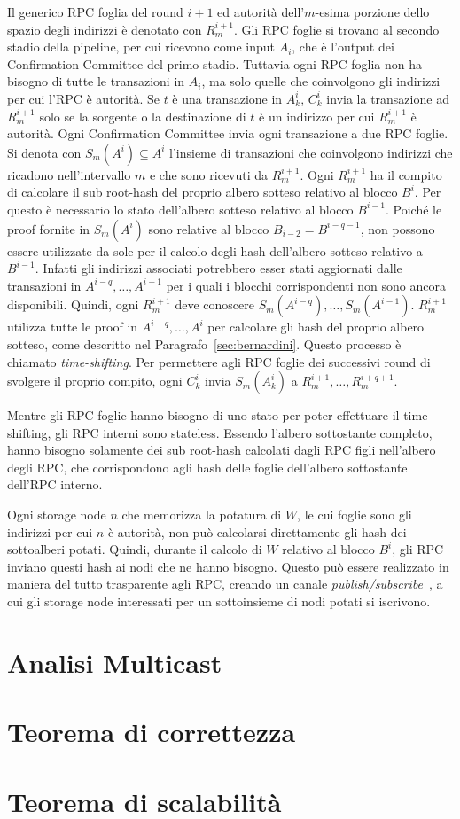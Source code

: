 Il generico RPC foglia del round $i+1$ ed autorità dell'$m$-esima porzione dello spazio degli indirizzi è denotato con $R_m^{i+1}$. Gli RPC foglie si trovano al secondo stadio della pipeline, per cui ricevono come input $A_i$, che è l'output dei Confirmation Committee del primo stadio. Tuttavia ogni RPC foglia non ha bisogno di tutte le transazioni in $A_i$, ma solo quelle che coinvolgono gli indirizzi per cui l'RPC è autorità. Se $t$ è una transazione in $A_k^i$, $C_k^i$ invia la transazione ad $R_m^{i+1}$ solo se la sorgente o la destinazione di $t$ è un indirizzo per cui $R_m^{i+1}$ è autorità. Ogni Confirmation Committee invia ogni transazione a due RPC foglie. Si denota con $S_m(A^i) \subseteq A^i$ l'insieme di transazioni che coinvolgono indirizzi che ricadono nell'intervallo $m$ e che sono ricevuti da $R_m^{i+1}$. Ogni $R_m^{i+1}$ ha il compito di calcolare il sub root-hash del proprio albero sotteso relativo al blocco $B^i$. Per questo è necessario lo stato dell'albero sotteso relativo al blocco $B^{i-1}$. Poiché le proof fornite in $S_m(A^i)$ sono relative al blocco $B_{i-2} = B^{i-q-1}$, non possono essere utilizzate da sole per il calcolo degli hash dell'albero sotteso relativo a $B^{i-1}$. Infatti gli indirizzi associati potrebbero esser stati aggiornati dalle transazioni in $A^{i-q}, \dots, A^{i-1}$ per i quali i blocchi corrispondenti non sono ancora disponibili. Quindi, ogni $R_m^{i+1}$ deve conoscere $S_m(A^{i-q}), \dots, S_m(A^{i-1})$. $R_m^{i+1}$ utilizza tutte le proof in $A^{i-q}, \dots, A^{i}$ per calcolare gli hash del proprio albero sotteso, come descritto nel Paragrafo~\ref{sec:bernardini}. Questo processo è chiamato \emph{time-shifting}. Per permettere agli RPC foglie dei successivi round di svolgere il proprio compito, ogni $C_k^i$ invia $S_m(A_k^i)$ a $R_m^{i+1}, \dots, R_m^{i+q+1}$.

Mentre gli RPC foglie hanno bisogno di uno stato per poter effettuare il time-shifting, gli RPC interni sono stateless. Essendo l'albero sottostante completo, hanno bisogno solamente dei sub root-hash calcolati dagli RPC figli nell'albero degli RPC, che corrispondono agli hash delle foglie dell'albero sottostante dell'RPC interno.

Ogni storage node $n$ che memorizza la potatura di $W$, le cui foglie sono gli indirizzi per cui $n$ è autorità, non può calcolarsi direttamente gli hash dei sottoalberi potati. Quindi, durante il calcolo di $W$ relativo al blocco $B^i$, gli RPC inviano questi hash ai nodi che ne hanno bisogno. Questo può essere realizzato in maniera del tutto trasparente agli RPC, creando un canale \textit{publish/subscribe}~\cite{eugster2003many}, a cui gli storage node interessati per un sottoinsieme di nodi potati si iscrivono.


\section{Analisi Multicast}

\section{Teorema di correttezza}

\section{Teorema di scalabilità}